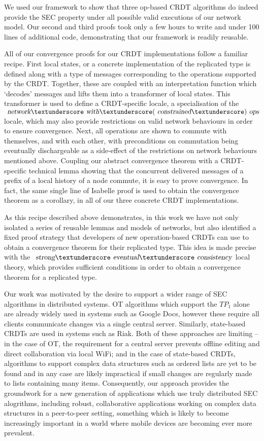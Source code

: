 \documentclass[acmlarge,review,anonymous]{acmart}\settopmatter{printfolios=true}
\begin{document}
We used our framework to show that three op-based CRDT algorithms do indeed provide the SEC property under all possible valid executions of our network model.
Our second and third proofs took only a few hours to write and under 100 lines of additional code, demonstrating that our framework is readily reusable.

All of our convergence proofs for our CRDT implementations follow a familiar recipe.
First local states, or a concrete implementation of the replicated type is defined along with a type of messages corresponding to the operations supported by the CRDT.
Together, these are coupled with an interpretation function which `decodes' messages and lifts them into a transformer of local states.
This transformer is used to define a CRDT-specific locale, a specialisation of the $\isa{network}{\isacharunderscore}\isa{with}{\isacharunderscore}(\isa{constrained}{\isacharunderscore})\isa{ops}$ locale, which may also provide restrictions on valid network behaviours in order to ensure convergence.
Next, all operations are shown to commute with themselves, and with each other, with preconditions on commutation being eventually dischargeable as a side-effect of the restrictions on network behaviours mentioned above.
Coupling our abstract convergence theorem with a CRDT-specific technical lemma showing that the concurrent delivered messages of a prefix of a local history of a node commute, it is easy to prove convergence.
In fact, the same single line of Isabelle proof is used to obtain the convergence theorem as a corollary, in all of our three concrete CRDT implementations.

As this recipe described above demonstrates, in this work we have not only isolated a series of reusable lemmas and models of networks, but also identified a fixed proof strategy that developers of new operation-based CRDTs can use to obtain a convergence theorem for their replicated type.
This idea is made precise with the $\isa{strong}{\isacharunderscore}\isa{eventual}{\isacharunderscore}\isa{consistency}$ local theory, which provides sufficient conditions in order to obtain a convergence theorem for a replicated type.

Our work was motivated by the desire to support a wider range of SEC algorithms in distributed systems.
OT algorithms which support the $\mathit{TP}_1$ alone are already widely used in systems such as Google Docs, however these require all clients communicate changes via a single central server.
Similarly, state-based CRDTs are used in systems such as Riak. Both of these approaches are limiting -- in the case of OT, the requirement for a central server prevents offline editing and direct collaboration via local WiFi; and in the case of state-based CRDTs, algorithms to support complex data structures such as ordered lists are yet to be found and in any case are likely impractical if small changes are regularly made to lists containing many items.
Consequently, our approach provides the groundwork for a new generation of applications which use truly distributed SEC alogrithms, including robust, collaborative applications working on complex data structures in a peer-to-peer setting, something which is likely to become increasingly important in a world where mobile devices are becoming ever more prevalent.
\end{document}

